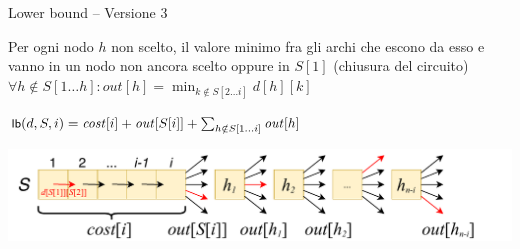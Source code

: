 \begin{frame}{Lower bound -- Versione 3}

\vspace{-9pt}
\begin{myboxtitle}
Per ogni nodo $h$ non scelto, il valore minimo fra gli archi che escono da esso e vanno in un nodo non ancora scelto oppure in $S[1]$ (chiusura del circuito)\\[6pt]
\alert{$
\forall h \notin S[1 \ldots h]: \mathit{out}[h] = \min_{k \not\in S[2 \ldots i]} d[h][k]
$}
\end{myboxtitle}	

\begin{myboxtitle}
\alert{$
\textsf{{\small lb}}(d, S, i) = \mathit{cost}[i] + \mathit{out}[S[i]] + \sum_{h \notin S[1 \ldots i]} \mathit{out}[h]
$}
\end{myboxtitle}	

\includegraphics[width=1.0\textwidth]{lower-bound1.pdf}
\end{frame}

